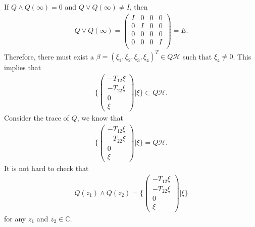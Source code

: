 \documentclass[a4paper,10pt]{amsart}
\newcommand{\HHH}{\mathcal H} %
\newcommand{\C}{\mathbb C} %
\begin{document}
If $Q \wedge Q(\infty) = 0$ and $Q \vee Q(\infty) \neq I$, then
\begin{align*}
    Q \vee Q(\infty) = 
    \begin{pmatrix}
        I & 0 & 0 & 0\\
        0 & I & 0 & 0\\
        0 & 0 & 0 & 0\\
        0 & 0 & 0 & I \\
    \end{pmatrix} = E.
\end{align*}
Therefore, there must exist a $\beta = (\xi_1, \xi_2, \xi_3, \xi_4)^{T}
\in Q\HHH$ such that $\xi_4 \neq 0$. This implies that
\begin{align*}
    \{ \begin{pmatrix}
            -T_{12}\xi\\
            -T_{22}\xi\\
            0\\
            \xi
    \end{pmatrix} | \xi \} \subset Q\HHH.
\end{align*}
Consider the trace of $Q$, we know that 
\begin{align*}
    \{ \begin{pmatrix}
            -T_{12}\xi\\
            -T_{22}\xi\\
            0\\
            \xi
    \end{pmatrix} | \xi \} = Q\HHH.
\end{align*}
It is not hard to check that
\begin{align*}
    Q(z_{1}) \wedge Q(z_{2}) =
    \{ \begin{pmatrix}
            -T_{12}\xi\\
            -T_{22}\xi\\
            0\\
            \xi
    \end{pmatrix} | \xi \} 
\end{align*}
for any $z_1$ and $z_2 \in \C$.
\end{document}
